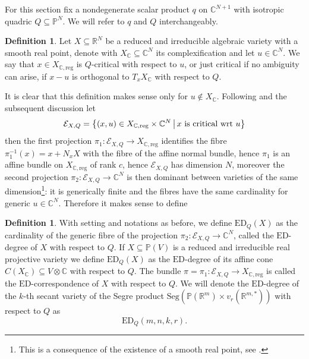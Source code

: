 \documentclass[11pt]{article}
\numberwithin{equation}{section}
\numberwithin{figure}{section}
\theoremstyle{plain}
\theoremstyle{definition}
\newtheorem{defn}[thm]{Definition}
\theoremstyle{remark}
\newcommand{\ot}{\otimes}
\newcommand{\su}{\subseteq}
\newcommand{\R}{\mathbb{R}}
\newcommand{\C}{\mathbb{C}}
\renewcommand{\P}{\mathbb{P}}
\newcommand{\ED}{\mathrm{ED}}
\newcommand{\Seg}{\mathrm{Seg}}
\begin{document}
For this section fix a nondegenerate scalar product $q$ on $\C^{N+1}$ with isotropic quadric $Q\su\P^N$. We will refer to $q$ and $Q$ interchangeably.

\begin{defn}
Let $X\su\R^{N}$ be a reduced and irreducible algebraic variety with a smooth real point, denote with $X_{\C}\su\C^{N}$ its complexification and let $u\in\C^{N}$. We say that $x\in X_{\C,{\mathrm{reg}}}$ is $Q$-critical with respect to $u$, or just critical if no ambiguity can arise, if $x-u$ is orthogonal to $T_{x}X_{\C}$ with respect to $Q$.
\end{defn}

It is clear that this definition makes sense only for $u\not\in X_{\C}$. Following \cite[Theorem 4.1]{DHOST} and the subsequent discussion let 
\[
\mathcal{E}_{X,Q}=\left\{ \left(x,u\right)\in X_{\C,{\mathrm{reg}}}\times\C^{N}\,\big| \,\mbox{\ensuremath{x} is critical wrt \ensuremath{u}}\right\} 
\]
then the first projection $\pi_{1}:\mathcal{E}_{X,Q}\to X_{\C,{\mathrm{reg}}}$
identifies the fibre $\pi_{1}^{-1}\left(x\right)=x+N_{x}X$ with the
fibre of the affine normal bundle, hence $\pi_{1}$ is an affine bundle
on $X_{\C,{\mathrm{reg}}}$ of rank $c$, hence $\mathcal{E}_{X,Q}$ has
dimension $N$, moreover the second projection $\pi_{2}:\mathcal{E}_{X,Q}\to\C^{N}$
is then dominant between varieties of the same dimension\footnote{This is a consequence of the existence of a smooth real point, see \cite[Theorem 4.1]{DHOST}.}: it is generically finite and the fibres have the same cardinality
for generic $u\in\C^{N}$. Therefore it makes sense to define 
\begin{defn}\label{def:EDDegree}
With setting and notations as before, we define $\ED_Q\left(X\right)$
as the cardinality of the generic fibre of the projection $\pi_{2}:\mathcal{E}_{X,Q}\to\C^{N}$,
called the $\ED$-degree of $X$ with respect to $Q$. If $X\su\P\left(V\right)$ is a
reduced and irreducible real projective variety we define $\ED_Q\left(X\right)$
as the $\ED$-degree of its affine cone $C\left(X_{\C}\right)\su V\ot\C$ with respect to $Q$. The bundle $\pi=\pi_{1}:\mathcal{E}_{X,Q}\to X_{\C,\mathrm{reg}}$ is
called the $\ED$-correspondence of $X$ with respect to $Q$. We will denote the $\ED$-degree of the $k$-th secant variety of the Segre product $\Seg\left(\P\left( \R^m\right) \times v_r \left(\R^{m,\ast}\right) \right)$ with respect to $Q$ as
\[
\ED_Q\left( m,n,k,r\right).
\]
\end{defn}
\end{document}
